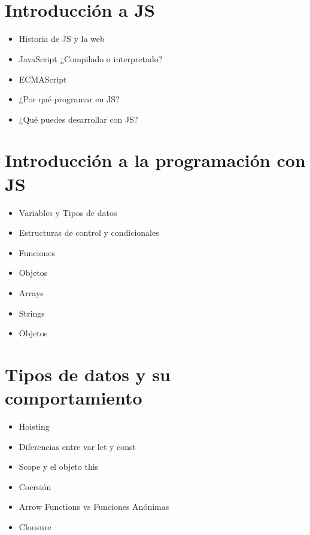 \documentclass{./lib/temarioptc}
\begin{document}
\vspace*{5mm}
\setlength{\parindent}{0pt}

\bigskip
{\color{colorPrimary}\Huge \mytitle }\\{\color{colorSecondary}\LARGE \mysubTitle } \\[2mm] \deliverDate

\normalcolor
\normalsize
\normalfont

\selectfont

\section{Introducción a JS}
\begin{itemize}
	\item Historia de JS y la web
	\item JavaScript ¿Compilado o interpretado?
	\item ECMAScript
	\item ¿Por qué programar en JS?
	\item ¿Qué puedes desarrollar con JS?
\end{itemize}

\section{Introducción a la programación con JS}
\begin{itemize}
	\item Variables y Tipos de datos
	\item Estructuras de control y condicionales
	\item Funciones
	\item Objetos
	\item Arrays
	\item Strings
	\item Objetos
\end{itemize}

\section{Tipos de datos y su comportamiento}
\begin{itemize}
	\item Hoisting
	\item Diferencias entre var let y const
	\item Scope y el objeto this
	\item Coersión
	\item Arrow Functions vs Funciones Anónimas
	\item Clousure
\end{itemize}
\end{document}
